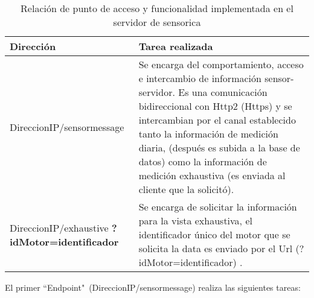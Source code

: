     \begin{table}[ht]
        \begin{center}
        \caption[Funciones Servidor Sensorica]{ Relación de punto de acceso y
        funcionalidad implementada en el servidor de sensorica}
        \label{tab:ServerSensorica}

            \vspace{0.3cm}
            \begin{tabular}{|p{5cm}|p{10cm}|}
                \hline
                Dirección       & Tarea realizada
                \\\hline\hline
                DireccionIP/sensormessage &
                Se encarga del comportamiento, acceso
                e intercambio de información sensor-servidor. Es una comunicación
                bidireccional con Http2 (Https) y se intercambian por el canal
                establecido tanto la información de medición diaria, (después es
                subida a la base de datos) como la
                información de medición exhaustiva (es enviada al cliente que
                la solicitó).

                \\\hline
                DireccionIP/exhaustive \textbf{?idMotor=identificador}   &
                Se encarga de solicitar la información para la vista exhaustiva,
                el identificador único del motor que se solicita la data
                es enviado por el Url (?idMotor=identificador) .
                \\\hline
            \end{tabular}
        \end{center}
    \end{table}


    El primer ``Endpoint"\ (DireccionIP/sensormessage) realiza las siguientes tareas:

